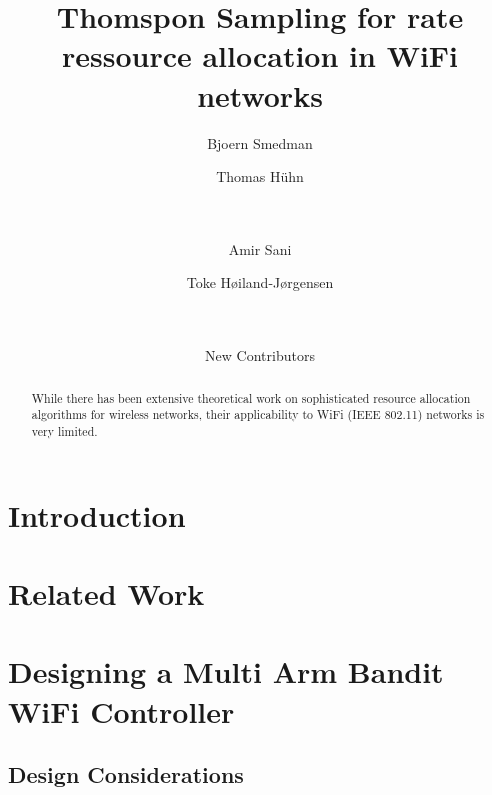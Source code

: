 \documentclass{sig-alternate}
\begin{document}
	\title{Thomspon Sampling for rate ressource allocation in WiFi networks}
	\subtitle{}
	\author{
		\alignauthor
		Bjoern Smedman\\
		\and
		\alignauthor
		Thomas H{\"u}hn\\
	    		\\
			\\
		\and
		\alignauthor
		Amir Sani\\
		\and
		Toke Høiland-Jørgensen\\
	    		\\
			\\
		\and
		\alignauthor
		New Contributors\\
	}

	\maketitle
	\sloppy

	\begin{abstract}
	While there has been extensive theoretical work on sophisticated
	resource allocation algorithms for wireless networks, their applicability 
	to WiFi (IEEE 802.11) networks is very limited.
	\end{abstract}


	\section{Introduction}
	\label{s:intro}


	\section{Related Work}
	\label{s:related}


	\section{Designing a Multi Arm Bandit WiFi Controller}
	\label{s:design} 

	\subsection{Design Considerations}
	\label{s:consider}
\end{document}
